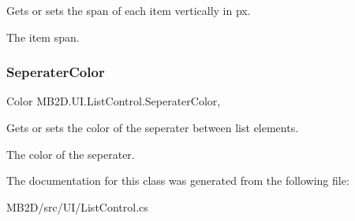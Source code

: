 Gets or sets the span of each item vertically in px. 

The item span.\hypertarget{class_m_b2_d_1_1_u_i_1_1_list_control_ac5c3ad4a524d48a490f7e4bfa088c0e1}{}\label{class_m_b2_d_1_1_u_i_1_1_list_control_ac5c3ad4a524d48a490f7e4bfa088c0e1} 
\subsubsection{\texorpdfstring{Seperater\+Color}{SeperaterColor}}
{\footnotesize\ttfamily Color M\+B2\+D.\+U\+I.\+List\+Control.\+Seperater\+Color\hspace{0.3cm}{\ttfamily [get]}, {\ttfamily [set]}}



Gets or sets the color of the seperater between list elements. 

The color of the seperater.

The documentation for this class was generated from the following file\+:\begin{DoxyCompactItemize}
\item 
M\+B2\+D/src/\+U\+I/List\+Control.\+cs\end{DoxyCompactItemize}
